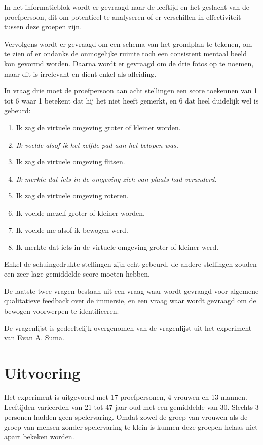 In het informatieblok wordt er gevraagd naar de leeftijd en het geslacht van de
proefpersoon, dit om potentieel te analyseren of er verschillen in effectiviteit
tussen deze groepen zijn.

Vervolgens wordt er gevraagd om een schema van het grondplan te tekenen, om te
zien of er ondanks de onmogelijke ruimte toch een consistent mentaal beeld kon
gevormd worden. Daarna wordt er gevraagd om de drie fotos op te noemen, maar 
dit is irrelevant en dient enkel als afleiding.

In vraag drie moet de proefpersoon aan acht stellingen een score toekennen van 1
tot 6 waar 1 betekent dat hij het niet heeft gemerkt, en 6 dat heel duidelijk wel 
is gebeurd:

\begin{enumerate}
  \item Ik zag de virtuele omgeving groter of kleiner worden.
  \item \emph{Ik voelde alsof ik het zelfde pad aan het belopen was.}
  \item Ik zag de virtuele omgeving flitsen.
  \item \emph{Ik merkte dat iets in de omgeving zich van plaats had veranderd.}
  \item Ik zag de virtuele omgeving roteren.
  \item Ik voelde mezelf groter of kleiner worden.
  \item Ik voelde me alsof ik bewogen werd.
  \item Ik merkte dat iets in de virtuele omgeving groter of kleiner werd.
\end{enumerate}

Enkel de schuingedrukte stellingen zijn echt gebeurd, de andere stellingen zouden
een zeer lage gemiddelde score moeten hebben.

De laatste twee vragen bestaan uit een vraag waar wordt gevraagd voor algemene
qualitatieve feedback over de immersie, en een vraag waar wordt gevraagd om de 
bewogen voorwerpen te identificeren.

De vragenlijst is gedeeltelijk overgenomen van de vragenlijst uit het experiment
van Evan A. Suma\cite{suma11}.


\section{Uitvoering}
Het experiment is uitgevoerd met 17 proefpersonen, 4 vrouwen en 13 mannen.
Leeftijden varieerden van 21 tot 47 jaar oud met een gemiddelde van 30. Slechts
3 personen hadden geen spelervaring. Omdat zowel de groep van vrouwen als de
groep van mensen zonder spelervaring te klein is kunnen deze groepen helaas
niet apart bekeken worden.


